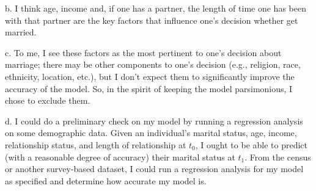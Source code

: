 \documentclass[letterpaper,12pt]{article}
\theoremstyle{definition}
\begin{document}
b.
I think age, income and, if one has a partner, the length of time one has been with that partner are the key factors that influence one's decision whether get married. 

c.
To me, I see these factors as the most pertinent to one's decision about marriage; there may be other components to one's decision (e.g., religion, race, ethnicity, location, etc.), but I don't expect them to significantly improve the accuracy of the model. So, in the spirit of keeping the model parsimonious, I chose to exclude them.

d.
I could do a preliminary check on my model by running a regression analysis on some demographic data. Given an individual's marital status, age, income, relationship status, and length of relationship at $t_0$, I ought to be able to predict (with a reasonable degree of accuracy) their marital status at $t_1$. From the census or another survey-based dataset, I could run a regression analysis for my model as specified and determine how accurate my model is. 
\end{document}
